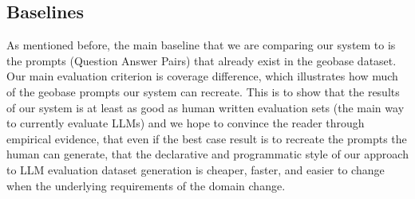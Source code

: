 \documentclass{article}
\begin{document}
\subsection{Baselines}
As mentioned before, the main baseline that we are comparing our system to is the prompts (Question Answer Pairs) that already exist in the geobase dataset. Our main evaluation criterion is coverage difference, which illustrates how much of the geobase prompts our system can recreate. This is to show that the results of our system is at least as good as human written evaluation sets (the main way to currently evaluate LLMs) and we hope to convince the reader through empirical evidence, that even if the best case result is to recreate the prompts the human can generate, that the declarative and programmatic style of our approach to LLM evaluation dataset generation is cheaper, faster, and easier to change when the underlying requirements of the domain change. 









\end{document}
